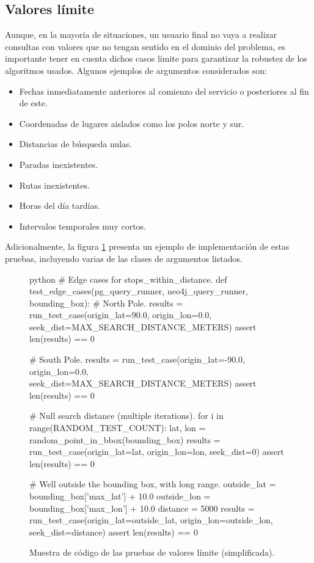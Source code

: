 \subsection{Valores límite}

Aunque, en la mayoría de situaciones, un usuario final no vaya a realizar consultas con valores que no tengan sentido en el dominio del problema, es importante tener en cuenta dichos casos límite para garantizar la robustez de los algoritmos usados. Algunos ejemplos de argumentos considerados son:

\begin{itemize}
    \item Fechas inmediatamente anteriores al comienzo del servicio o posteriores al fin de este.
    \item Coordenadas de lugares aislados como los polos norte y sur.
    \item Distancias de búsqueda nulas.
    \item Paradas inexistentes.
    \item Rutas inexistentes.
    \item Horas del día tardías.
    \item Intervalos temporales muy cortos.
\end{itemize}

Adicionalmente, la figura \ref{test:edge_cases_code} presenta un ejemplo de implementación de estas pruebas, incluyendo varias de las clases de argumentos listados.

\begin{figure}[h]
    \centering
    \begin{huggedminted}{python}
# Edge cases for stops_within_distance.
def test_edge_cases(pg_query_runner, neo4j_query_runner, bounding_box):
    # North Pole.
    results = run_test_case(origin_lat=90.0, origin_lon=0.0,
                            seek_dist=MAX_SEARCH_DISTANCE_METERS)
    assert len(results) == 0

    # South Pole.
    results = run_test_case(origin_lat=-90.0, origin_lon=0.0,
                            seek_dist=MAX_SEARCH_DISTANCE_METERS)
    assert len(results) == 0

    # Null search distance (multiple iterations).
    for i in range(RANDOM_TEST_COUNT):
        lat, lon = random_point_in_bbox(bounding_box)
        results = run_test_case(origin_lat=lat, origin_lon=lon, seek_dist=0)
        assert len(results) == 0

    # Well outside the bounding box, with long range.
    outside_lat = bounding_box['max_lat'] + 10.0
    outside_lon = bounding_box['max_lon'] + 10.0
    distance = 5000
    results = run_test_case(origin_lat=outside_lat, origin_lon=outside_lon,
                            seek_dist=distance)
    assert len(results) == 0
    \end{huggedminted}
    \caption{Muestra de código de las pruebas de valores límite (simplificada).}
    \label{test:edge_cases_code}
\end{figure}

